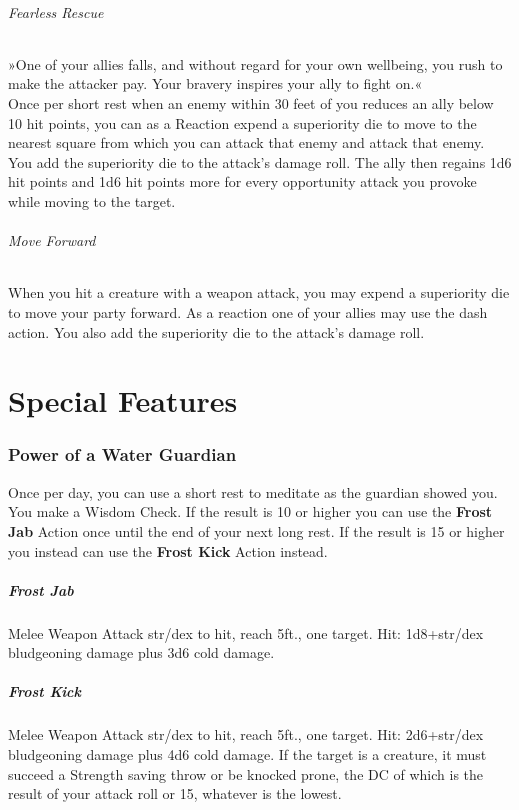\documentclass[letter,10pt,twocolumn,openany]{dndbook}
\begin{document}
\subparagraph{Fearless Rescue}
»One of your allies falls, and without regard for your own wellbeing, you rush to make the attacker pay. Your bravery inspires your ally to fight on.«\\
Once per short rest when an enemy within 30 feet of you reduces an ally below 10 hit points, you can as a Reaction expend a superiority die to move to the nearest square from which you can attack that enemy and attack that enemy. You add the superiority die to the attack's damage roll.
The ally then regains 1d6 hit points and 1d6 hit points more for every opportunity attack you provoke while moving to the target.

\subparagraph{Move Forward}
When you hit a creature with a weapon attack, you may expend a superiority die to move your party forward.
As a reaction one of your allies may use the dash action.
You also add the superiority die to the attack's damage roll.

\chapter{Special Features}

\subsection{Power of a Water Guardian}

Once per day, you can use a short rest to meditate as the guardian showed you. You make a Wisdom Check. If the result is 10 or higher you can use the \textbf{Frost Jab} Action once until the end of your next long rest. If the result is 15 or higher you instead can use the \textbf{Frost Kick} Action instead.

\paragraph{Frost Jab} Melee Weapon Attack str/dex to hit, reach 5ft., one target. Hit: 1d8+str/dex bludgeoning damage plus 3d6 cold damage.

\paragraph{Frost Kick} Melee Weapon Attack str/dex to hit, reach 5ft., one target. Hit: 2d6+str/dex bludgeoning damage plus 4d6 cold damage. If the target is a creature, it must succeed a Strength saving throw or be knocked prone, the DC of which is the result of your attack roll or 15, whatever is the lowest.
\end{document}
